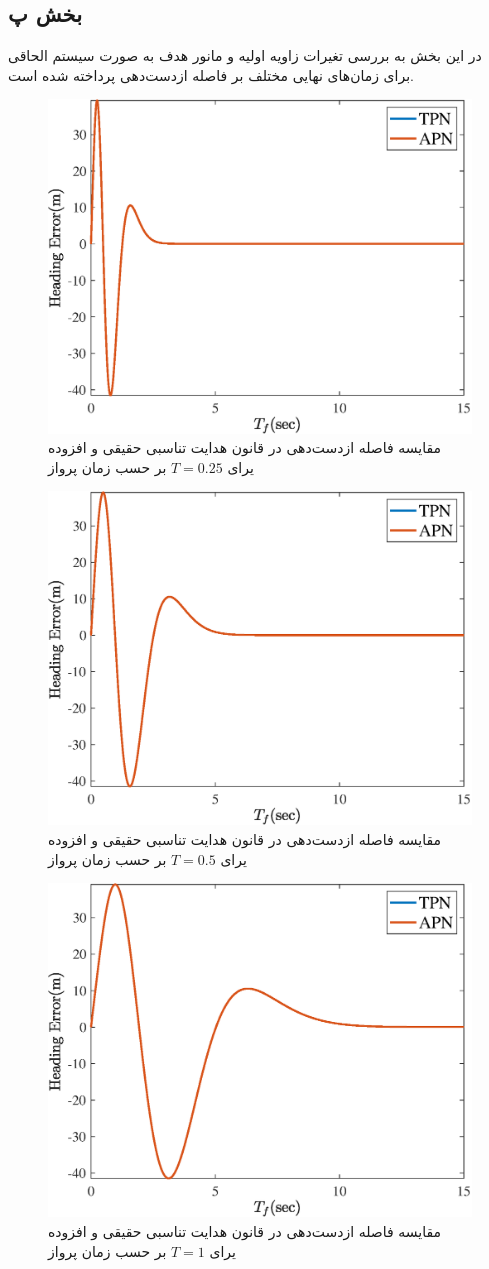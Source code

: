 \subsection{بخش پ}
در این بخش به بررسی تغیرات زاویه اولیه و مانور هدف به صورت سیستم الحاقی برای زمان‌های نهایی مختلف بر فاصله از‌دست‌دهی پرداخته شده است.
\begin{figure}[H]
	\centering
	\includegraphics[width=.75\linewidth]{../Figure/Q2/c/HE_25}
	\caption{مقایسه فاصله ازدست‌دهی در قانون هدایت تناسبی حقیقی و افزوده یرای $T=0.25$ بر حسب زمان پرواز}
\end{figure}

\begin{figure}[H]
	\centering
	\includegraphics[width=.75\linewidth]{../Figure/Q2/c/HE_5}
	\caption{مقایسه فاصله ازدست‌دهی در قانون هدایت تناسبی حقیقی و افزوده یرای $T=0.5$ بر حسب زمان پرواز}
\end{figure}

\begin{figure}[H]
	\centering
	\includegraphics[width=.75\linewidth]{../Figure/Q2/c/HE_1}
	\caption{مقایسه فاصله ازدست‌دهی در قانون هدایت تناسبی حقیقی و افزوده یرای $T=1$ بر حسب زمان پرواز}
\end{figure}
